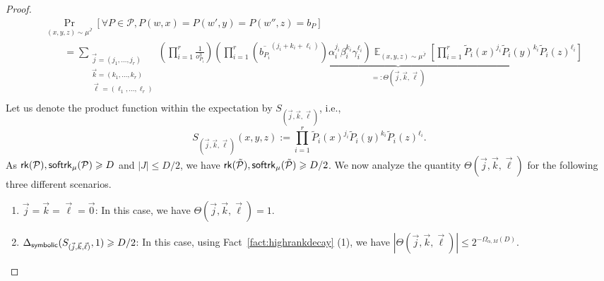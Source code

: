 \documentclass[10pt,a4paper]{amsart}
\newcommand\card[1]{\left| {#1} \right|}
\newcommand\Prob[2]{{\Pr_{#1}\left[ {#2} \right]}}
\newcommand\Expect[2]{{\mathop{\mathbb{E}}_{#1}\left[ {#2} \right]}}
\renewcommand\geq{\geqslant}
\renewcommand\leq{\leqslant}
\begin{document}
\begin{proof}
         \begin{align*}
          &\Prob{(x,y,z)\sim\mu^{\bar{J}}}{\forall P\in \mathcal{P}, P(w,x)=P(w',y)=P(w'',z) = b_P} \\
          &\quad\quad= \sum_{\substack{\vec{j} = (j_1, \ldots, j_r) \\ \vec{k} = (k_1, \ldots, k_r) \\ \vec{\ell} = (\ell_1, \ldots, \ell_r)}}  \left(\prod_{i=1}^r \frac{1}{o_{P_i}^3}\right)\underbrace{\left(\prod_{i=1}^r \left(\overline{b_{P_i}}^{(j_i +k_i+\ell_i)}\right) \alpha_i^{j_i} \beta_i^{k_i} \gamma_i^{\ell_i}\right) \Expect{(x,y,z)\sim\mu^{\bar{J}}}{\prod_{i=1}^r \tilde{P}_i(x)^{j_i} \tilde{P}_i(y)^{k_i} \tilde{P}_i(z)^{\ell_i}}}_{=:\Theta(\vec{j}, \vec{k}, \vec{\ell})}\\
      \end{align*}
     Let us denote the product function within the expectation by $S_{(\vec{j}, \vec{k}, \vec{\ell})}$, i.e., 
     $$ S_{(\vec{j}, \vec{k}, \vec{\ell})}(x, y, z):= \prod_{i=1}^r \tilde{P}_i(x)^{j_i} \tilde{P}_i(y)^{k_i} \tilde{P}_i(z)^{\ell_i}.$$
     As  ${\sf rk}(\mathcal{P}),{\sf softrk}_{\mu}(\mathcal{P})\geq D$ and $|J|\leq D/2$, we have ${\sf rk}(\tilde{\mathcal{P}}),{\sf softrk}_{\mu}(\tilde{\mathcal{P}})\geq D/2$. We now analyze the quantity $\Theta(\vec{j}, \vec{k}, \vec{\ell})$ for the following three different scenarios. 
     \begin{enumerate}
         \item[(a)] $\vec{j} = \vec{k} = \vec{\ell} = \vec{0}$: In this case, we have $\Theta(\vec{j}, \vec{k}, \vec{\ell})= 1$.
         
         \item[(b)] $\Delta_{{\sf symbolic}}(S_{(\vec{j}, \vec{k}, \vec{\ell})},1)\geq D/2$: In this case, using Fact~\ref{fact:highrankdecay} (1), we have $\card{\Theta(\vec{j}, \vec{k}, \vec{\ell})} \leq 2^{-\Omega_{\alpha, M}(D)}$.
         

\end{enumerate}
\end{proof}
\end{document}
